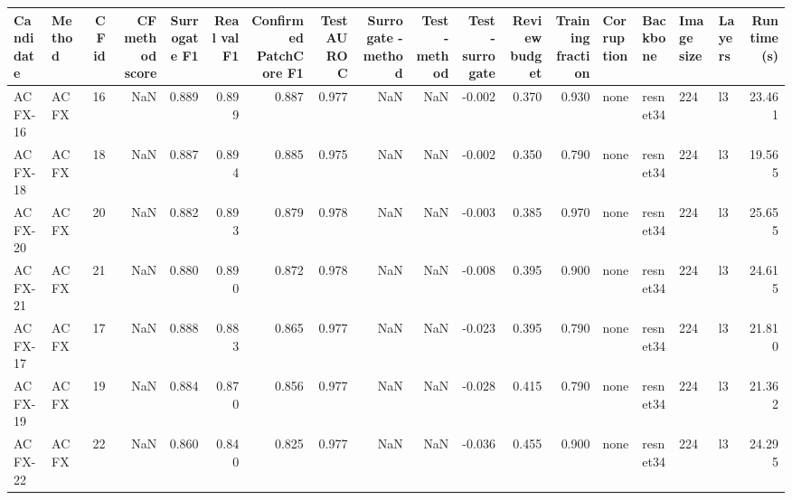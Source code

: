 \begin{tabular}{llrrrrrrrrrrrllllr}
\toprule
Candidate & Method &  CF id &  CF method score &  Surrogate F1 &  Real val F1 &  Confirmed PatchCore F1 &  Test AUROC &  Surrogate - method &  Test - method &  Test - surrogate &  Review budget &  Training fraction & Corruption & Backbone & Image size & Layers &  Runtime (s) \\
\midrule
  ACFX-16 &   ACFX &     16 &              NaN &         0.889 &        0.899 &                   0.887 &       0.977 &                 NaN &            NaN &            -0.002 &          0.370 &              0.930 &       none & resnet34 &        224 &     l3 &       23.461 \\
  ACFX-18 &   ACFX &     18 &              NaN &         0.887 &        0.894 &                   0.885 &       0.975 &                 NaN &            NaN &            -0.002 &          0.350 &              0.790 &       none & resnet34 &        224 &     l3 &       19.565 \\
  ACFX-20 &   ACFX &     20 &              NaN &         0.882 &        0.893 &                   0.879 &       0.978 &                 NaN &            NaN &            -0.003 &          0.385 &              0.970 &       none & resnet34 &        224 &     l3 &       25.655 \\
  ACFX-21 &   ACFX &     21 &              NaN &         0.880 &        0.890 &                   0.872 &       0.978 &                 NaN &            NaN &            -0.008 &          0.395 &              0.900 &       none & resnet34 &        224 &     l3 &       24.615 \\
  ACFX-17 &   ACFX &     17 &              NaN &         0.888 &        0.883 &                   0.865 &       0.977 &                 NaN &            NaN &            -0.023 &          0.395 &              0.790 &       none & resnet34 &        224 &     l3 &       21.810 \\
  ACFX-19 &   ACFX &     19 &              NaN &         0.884 &        0.870 &                   0.856 &       0.977 &                 NaN &            NaN &            -0.028 &          0.415 &              0.790 &       none & resnet34 &        224 &     l3 &       21.362 \\
  ACFX-22 &   ACFX &     22 &              NaN &         0.860 &        0.840 &                   0.825 &       0.977 &                 NaN &            NaN &            -0.036 &          0.455 &              0.900 &       none & resnet34 &        224 &     l3 &       24.295 \\

\end{tabular}
